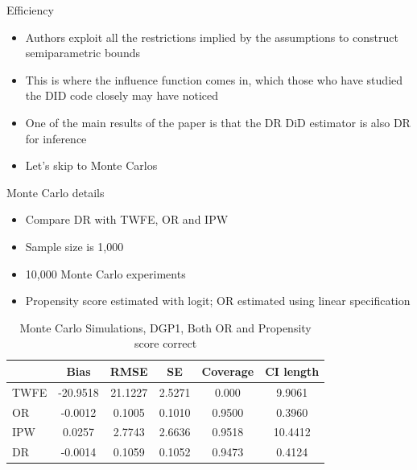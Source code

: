 \documentclass{beamer}
\begin{document}
\begin{frame}{Efficiency}

\begin{itemize}
\item Authors exploit all the restrictions implied by the assumptions to construct semiparametric bounds
\item This is where the influence function comes in, which those who have studied the DID code closely may have noticed
\item One of the main results of the paper is that the DR DiD estimator is also DR for inference
\item Let's skip to Monte Carlos
\end{itemize}

\end{frame}

\begin{frame}{Monte Carlo details}

\begin{itemize}
\item Compare DR with TWFE, OR and IPW
\item Sample size is 1,000
\item 10,000 Monte Carlo experiments
\item Propensity score estimated with logit; OR estimated using linear specification
\end{itemize}

\end{frame}



\begin{frame}[plain]

\begin{table}[htbp]\centering
\scriptsize
\caption{Monte Carlo Simulations, DGP1, Both OR and Propensity score correct}
\centering
\begin{threeparttable}
\begin{tabular}{l*{5}{c}}
\toprule
\multicolumn{1}{l}{\textbf{}}&
\multicolumn{1}{c}{\textbf{Bias}}&
\multicolumn{1}{c}{\textbf{RMSE}}&
\multicolumn{1}{c}{\textbf{SE}}&
\multicolumn{1}{c}{\textbf{Coverage}}&
\multicolumn{1}{c}{\textbf{CI length}}\\
\midrule
TWFE & -20.9518 & 21.1227 & 2.5271 & 0.000 & 9.9061 \\
OR & -0.0012 & 0.1005 & 0.1010 & 0.9500 & 0.3960 \\
IPW & 0.0257 & 2.7743 & 2.6636 & 0.9518 & 10.4412 \\
DR & -0.0014 & 0.1059 & 0.1052 & 0.9473 & 0.4124 \\
\bottomrule
\end{tabular}
\end{threeparttable}
\end{table}

\end{frame}
\end{document}
